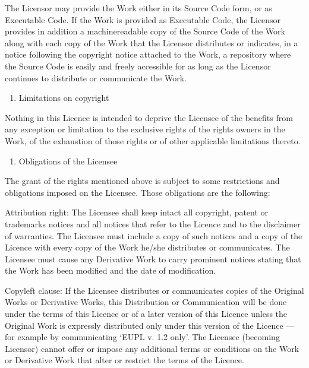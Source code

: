 \documentclass[letterpaper,10pt,english]{sphinxmanual}
\begin{document}
\sphinxAtStartPar
The Licensor may provide the Work either in its Source Code form, or as
Executable Code. If the Work is provided as Executable Code, the Licensor
provides in addition a machine\sphinxhyphen{}readable copy of the Source Code of the Work
along with each copy of the Work that the Licensor distributes or indicates, in
a notice following the copyright notice attached to the Work, a repository where
the Source Code is easily and freely accessible for as long as the Licensor
continues to distribute or communicate the Work.
\begin{enumerate}
%
\setcounter{enumi}{3}
\item {} 
\sphinxAtStartPar
Limitations on copyright

\end{enumerate}

\sphinxAtStartPar
Nothing in this Licence is intended to deprive the Licensee of the benefits from
any exception or limitation to the exclusive rights of the rights owners in the
Work, of the exhaustion of those rights or of other applicable limitations
thereto.
\begin{enumerate}
%
\setcounter{enumi}{4}
\item {} 
\sphinxAtStartPar
Obligations of the Licensee

\end{enumerate}

\sphinxAtStartPar
The grant of the rights mentioned above is subject to some restrictions and
obligations imposed on the Licensee. Those obligations are the following:

\sphinxAtStartPar
Attribution right: The Licensee shall keep intact all copyright, patent or
trademarks notices and all notices that refer to the Licence and to the
disclaimer of warranties. The Licensee must include a copy of such notices and a
copy of the Licence with every copy of the Work he/she distributes or
communicates. The Licensee must cause any Derivative Work to carry prominent
notices stating that the Work has been modified and the date of modification.

\sphinxAtStartPar
Copyleft clause: If the Licensee distributes or communicates copies of the
Original Works or Derivative Works, this Distribution or Communication will be
done under the terms of this Licence or of a later version of this Licence
unless the Original Work is expressly distributed only under this version of the
Licence — for example by communicating ‘EUPL v. 1.2 only’. The Licensee
(becoming Licensor) cannot offer or impose any additional terms or conditions on
the Work or Derivative Work that alter or restrict the terms of the Licence.
\end{document}
